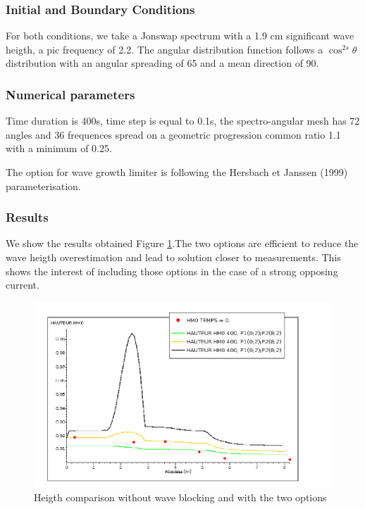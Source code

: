 %
%
\subsubsection{Initial and Boundary Conditions}
%
For both conditions, we take a Jonswap spectrum with a 1.9 cm significant wave heigth, a pic frequency of 2.2. The angular distribution function follows a $\cos^{2s} \theta$ distribution with an angular spreading of 65 and a mean direction of 90.
%
%
\subsubsection{Numerical parameters}
%
Time duration is 400s, time step is equal to 0.1s, the spectro-angular mesh has 72 angles and 36 frequences spread on a geometric progression common ratio 1.1 with a minimum of 0.25.

The option for wave growth limiter is following the Hersbach et Janssen (1999) parameterisation.

%
%
\subsubsection{Results}
%
We show the results obtained Figure \ref{reswaveblocking}.The two options are efficient to reduce the wave heigth overestimation and lead to solution closer to measurements. This shows the interest of including those options in the case of a strong opposing current.

\begin{figure} [!h]
\centering
\includegraphics[scale = 0.4]{hauteur.png}
 \caption{Heigth comparison without wave blocking and with the two options}
\label{reswaveblocking}
\end{figure}




